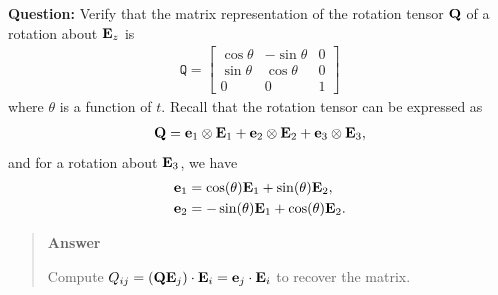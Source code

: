 \documentclass[
  letterpaper,
  DIV=11,
  numbers=noendperiod]{scrreprt}
\newcommand{\lp}{\left(}
\newcommand{\rp}{\right)}
\begin{document}
\begin{tcolorbox}[enhanced jigsaw, arc=.35mm, bottomrule=.15mm, bottomtitle=1mm, breakable, colback=white, colbacktitle=quarto-callout-tip-color!10!white, colframe=quarto-callout-tip-color-frame, coltitle=black, left=2mm, leftrule=.75mm, opacityback=0, opacitybacktitle=0.6, rightrule=.15mm, title=\textcolor{quarto-callout-tip-color}{\faLightbulb}\hspace{0.5em}{Think!}, titlerule=0mm, toprule=.15mm, toptitle=1mm]

\textbf{Question:} Verify that the matrix representation of the rotation
tensor \({\bf Q}\) of a rotation about \({\bf E}_z\) is \begin{align*}
    \mathtt{Q} = \begin{bmatrix}\cos\theta & -\sin\theta & 0\\\sin\theta & \cos\theta & 0\\0 & 0 & 1\end{bmatrix}
\end{align*} where \(\theta\) is a function of \(t\). Recall that the
rotation tensor can be expressed as \begin{align*}
    {\bf Q} = {\bf e}_1\otimes{\bf E}_1+{\bf e}_2\otimes{\bf E}_2+{\bf e}_3\otimes{\bf E}_3,
\end{align*} and for a rotation about \({\bf E}_3\), we have
\begin{align*}
    {\bf e}_1 &= \cos(\theta){\bf E}_1+\sin(\theta){\bf E}_2,\\
    {\bf e}_2 &= -\sin(\theta){\bf E}_1+\cos(\theta){\bf E}_2.
\end{align*}

\begin{quote}
\textbf{Answer}

Compute
\(Q_{ij} = \lp{\bf Q}{\bf E}_j\rp\cdot{\bf E}_i = {\bf e}_j\cdot{\bf E}_i\)
to recover the matrix.
\end{quote}

\end{tcolorbox}
\end{document}
